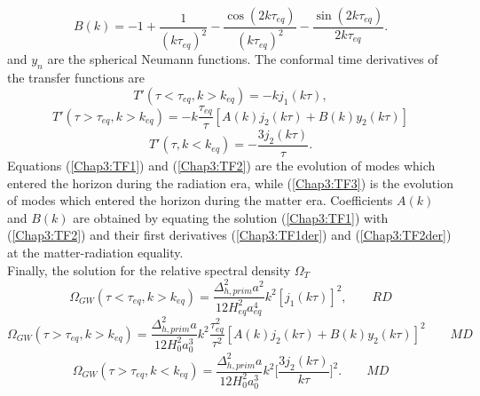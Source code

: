 \documentclass[11pt,a4paper,twoside]{book}
\begin{document}
\begin{equation}
	\label{Chap3:B(k)}
	B(k) = -1 + \frac{1}{(k\tau_{eq})^{2}} - \frac{\cos(2k\tau_{eq})}{(k\tau_{eq})^{2}} - \frac{\sin (2k\tau_{eq})}{2k\tau_{eq}}.
\end{equation}
and $ y_{n} $ are the spherical Neumann functions. The conformal time derivatives  of the transfer functions are
\begin{equation}
	\label{Chap3:TF1der}
	T'(\tau < \tau_{eq}, k>k_{eq}) = -kj_{1}(k\tau),
\end{equation}
\begin{equation}
	\label{Chap3:TF2der}
	T'(\tau > \tau_{eq},k > k_{eq}) = -k\frac{\tau_{eq}}{\tau}[A(k)j_{2}(k\tau) + B(k)y_{2}(k\tau)]
\end{equation}
\begin{equation}
	\label{Chap3:TF3der}
	T'(\tau,k < k_{eq}) = -\frac{3j_{2}(k\tau)}{\tau}.
\end{equation}
Equations (\ref{Chap3:TF1}) and (\ref{Chap3:TF2}) are the evolution of modes which entered the horizon during the radiation era, while (\ref{Chap3:TF3}) is the evolution of modes which entered the horizon during the matter era. Coefficients $ A(k) $ and $ B(k) $ are obtained by equating the solution (\ref{Chap3:TF1}) with (\ref{Chap3:TF2}) and their first derivatives (\ref{Chap3:TF1der}) and (\ref{Chap3:TF2der}) at the matter-radiation equality.\\
Finally, the solution for the relative spectral density $ \Omega_{T} $
\begin{equation}
	\label{Chap3:Omega1}
	\Omega_{GW}(\tau < \tau_{eq},k > k_{eq}) = \frac{\Delta_{h,prim}^{2}a^{2}}{12H^{2}_{eq}a^{4}_{eq}}k^{2}[j_{1}(k\tau)]^{2},
	\qquad
	RD
\end{equation}
\begin{equation}
	\label{Chap3:Omega2}
		\Omega_{GW}(\tau > \tau_{eq},k > k_{eq}) = \frac{\Delta_{h,prim}^{2}a}{12H_{0}^{2}a_{0}^{3}}k^{2}\frac{\tau_{eq}^{2}}{\tau^{2}}[A(k)j_{2}(k\tau) + B(k)y_{2}(k\tau)]^{2}
		\qquad
		MD
\end{equation}
\begin{equation}
	\label{Chap3:Omega3}
	\Omega_{GW}(\tau > \tau_{eq},k < k_{eq}) = \frac{\Delta_{h,prim}^{2}a}{12H_{0}^{2}a_{0}^{3}}k^{2}\Big [\frac{3j_{2}(k\tau)}{k\tau} \Big ]^{2}.
	\qquad
	MD
\end{equation}
\end{document}
